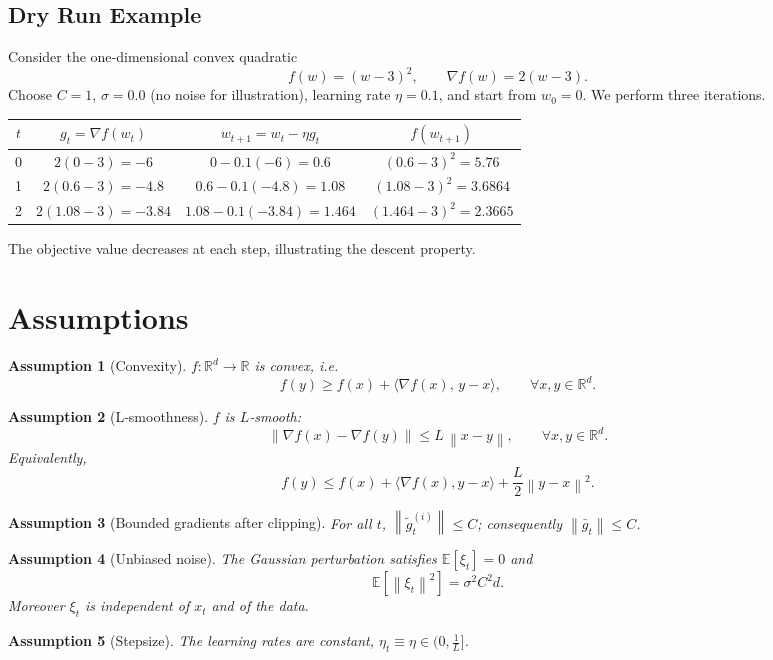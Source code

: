 \documentclass{article}
\newtheorem{assumption}{Assumption}
\newcommand{\E}{\mathbb{E}}
\newcommand{\R}{\mathbb{R}}
\newcommand{\norm}[1]{\left\lVert #1\right\rVert}
\begin{document}
\subsection*{Dry Run Example}
Consider the one‑dimensional convex quadratic
\[
f(w)=(w-3)^{2},\qquad \nabla f(w)=2(w-3).
\]
Choose $C=1$, $\sigma=0.0$ (no noise for illustration), learning rate $\eta=0.1$, and start from $w_{0}=0$.
We perform three iterations.

\begin{center}
\begin{tabular}{c|c|c|c}
$t$ & $g_t=\nabla f(w_t)$ & $w_{t+1}=w_t-\eta g_t$ & $f(w_{t+1})$\\\hline
0 & $2(0-3)=-6$ & $0-0.1(-6)=0.6$ & $(0.6-3)^{2}=5.76$\\
1 & $2(0.6-3)=-4.8$ & $0.6-0.1(-4.8)=1.08$ & $(1.08-3)^{2}=3.6864$\\
2 & $2(1.08-3)=-3.84$ & $1.08-0.1(-3.84)=1.464$ & $(1.464-3)^{2}=2.3665$\\
\end{tabular}
\end{center}
The objective value decreases at each step, illustrating the descent property.

\newpage

\section*{Assumptions}
\begin{assumption}[Convexity]\label{ass:convex}
$f:\R^{d}\to\R$ is convex, i.e.
\[
f(y)\ge f(x)+\langle\nabla f(x),\,y-x\rangle,\qquad\forall x,y\in\R^{d}.
\]
\end{assumption}
\begin{assumption}[L‑smoothness]\label{ass:smooth}
$f$ is $L$‑smooth:
\[
\norm{\nabla f(x)-\nabla f(y)}\le L\,\norm{x-y},\qquad\forall x,y\in\R^{d}.
\]
Equivalently,
\[
f(y)\le f(x)+\langle\nabla f(x),y-x\rangle+\frac{L}{2}\norm{y-x}^{2}.
\]
\end{assumption}
\begin{assumption}[Bounded gradients after clipping]\label{ass:clip}
For all $t$, $\norm{\tilde g_{t}^{(i)}}\le C$; consequently $\norm{\bar g_t}\le C$.
\end{assumption}
\begin{assumption}[Unbiased noise]\label{ass:noise}
The Gaussian perturbation satisfies $\E[\xi_t]=0$ and
\[
\E[\norm{\xi_t}^{2}]=\sigma^{2}C^{2}d .
\]
Moreover $\xi_t$ is independent of $x_t$ and of the data.
\end{assumption}
\begin{assumption}[Stepsize]\label{ass:stepsize}
The learning rates are constant, $\eta_t\equiv\eta\in\bigl(0,\tfrac{1}{L}\bigr]$.
\end{assumption}
\end{document}
